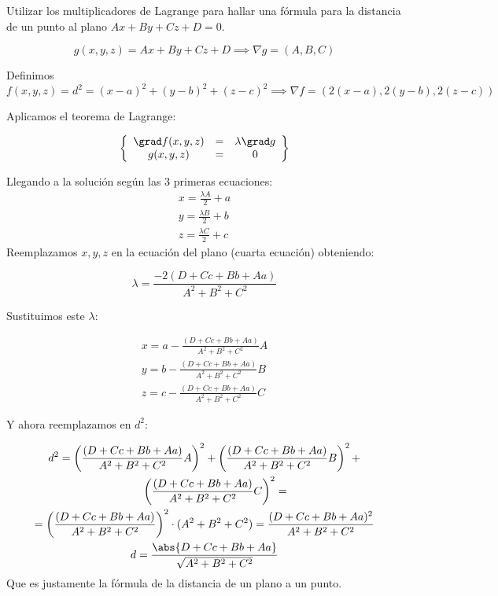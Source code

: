 \begin{problem}[18] Utilizar los multiplicadores de Lagrange para hallar una fórmula para la distancia de un punto al plano $Ax+By+Cz+D=0$.

\solution
\[g(x,y,z) = Ax+By+Cz+D \implies \nabla g = (A,B,C)\]

Definimos 
\[f(x,y,z) = d^2 = (x-a)^2 + (y-b)^2 + (z-c)^2 \implies \nabla f = (2(x-a),2(y-b),2(z-c))\]

Aplicamos el teorema de Lagrange:

\[\left\{\begin{array}{ccc}
\grad f(x,y,z) & = & \lambda \grad g\\
g(x,y,z) &= & 0
\end{array}\right\}\]

Llegando a la solución según las 3 primeras ecuaciones:
\begin{gather*}
x=\frac{\lambda A}{2} +a\\
y = \frac{\lambda B}{2} +b\\
z = \frac{\lambda C}{2} +c
\end{gather*}
Reemplazamos $x,y,z$ en la ecuación del plano (cuarta ecuación) obteniendo:

\[\lambda = \frac{-2(D+Cc+Bb+Aa)}{A^2+B^2+C^2}\]

Sustituimos este $\lambda$:

\begin{gather*}
x=a-\frac{(D+Cc+Bb+Aa)}{A^2+B^2+C^2} A \\
y = b- \frac{(D+Cc+Bb+Aa)}{A^2+B^2+C^2} B\\
z = c - \frac{(D+Cc+Bb+Aa)}{A^2+B^2+C^2} C
\end{gather*}

Y ahora reemplazamos en $d^2$:

\begin{gather*}
d^2 = \left(\frac{(D+Cc+Bb+Aa)}{A^2+B^2+C^2} A\right)^2 + \left(\frac{(D+Cc+Bb+Aa)}{A^2+B^2+C^2} B\right)^2 + \\
\qquad \left(\frac{(D+Cc+Bb+Aa)}{A^2+B^2+C^2} C\right)^2 = \\
 = \left(\frac{(D+Cc+Bb+Aa)}{A^2+B^2+C^2}\right)^2 \cdot (A^2+B^2+C^2) =\frac{(D+Cc+Bb+Aa)^2}{A^2+B^2+C^2} \\
  d=\frac{\abs{D+Cc+Bb+Aa}}{\sqrt{A^2+B^2+C^2}}
\end{gather*}
Que es justamente la fórmula de la distancia de un plano a un punto.

\end{problem}


